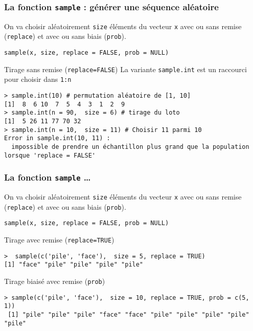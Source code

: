 \documentclass[10pt]{beamer}
\begin{document}
\begin{frame}[fragile]
  \frametitle{  La fonction \texttt{sample} : générer une séquence aléatoire}
  On va choisir aléatoirement \texttt{size} éléments du vecteur \texttt{x} avec ou sans remise (\texttt{replace}) et avec ou sans biais (\texttt{prob}).
  \begin{center}
    \alert{\texttt{sample(x, size, replace = FALSE, prob = NULL)}}
  \end{center}


  \begin{block}{Tirage sans remise (\texttt{replace=FALSE})}
La variante \texttt{sample.int} est un raccourci pour choisir dans \texttt{1:n}
    \begin{lstlisting}
> sample.int(10) # permutation aléatoire de [1, 10]
[1]  8  6 10  7  5  4  3  1  2  9
> sample.int(n = 90,  size = 6) # tirage du loto
[1]  5 26 11 77 70 32
> sample.int(n = 10,  size = 11) # Choisir 11 parmi 10
Error in sample.int(10, 11) :
  impossible de prendre un échantillon plus grand que la population lorsque 'replace = FALSE'
\end{lstlisting}
\end{block}
\end{frame}


\begin{frame}[fragile]
  \frametitle{  La fonction \texttt{sample} \dots}
  On va choisir aléatoirement \texttt{size} éléments du vecteur \texttt{x} avec ou sans remise (\texttt{replace}) et avec ou sans biais (\texttt{prob}).
  \begin{center}
    \alert{\texttt{sample(x, size, replace = FALSE, prob = NULL)}}
  \end{center}

\begin{block}{Tirage avec remise (\texttt{replace=TRUE})}
    \begin{lstlisting}[style=block]
>  sample(c('pile', 'face'),  size = 5, replace = TRUE)
[1] "face" "pile" "pile" "pile" "pile"
\end{lstlisting}
\end{block}


\begin{block}{Tirage biaisé avec remise (\texttt{prob})}
    \begin{lstlisting}[style=block]
> sample(c('pile', 'face'),  size = 10, replace = TRUE, prob = c(5, 1))
 [1] "pile" "pile" "pile" "face" "face" "pile" "pile" "pile" "pile" "pile"
\end{lstlisting}
\end{block}

\end{frame}
\end{document}
